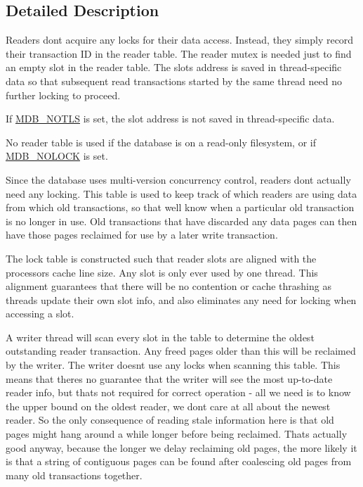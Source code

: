 \subsection{Detailed Description}
Readers don\textquotesingle{}t acquire any locks for their data access. Instead, they simply record their transaction ID in the reader table. The reader mutex is needed just to find an empty slot in the reader table. The slot\textquotesingle{}s address is saved in thread-\/specific data so that subsequent read transactions started by the same thread need no further locking to proceed.

If \mbox{\hyperlink{group__mdb__env_ga5dca84a576d14b4bfe2deddc2dc622d3}{M\+D\+B\+\_\+\+N\+O\+T\+LS}} is set, the slot address is not saved in thread-\/specific data.

No reader table is used if the database is on a read-\/only filesystem, or if \mbox{\hyperlink{group__mdb__env_ga9b0450b1a87cb9f22e033550e49e5037}{M\+D\+B\+\_\+\+N\+O\+L\+O\+CK}} is set.

Since the database uses multi-\/version concurrency control, readers don\textquotesingle{}t actually need any locking. This table is used to keep track of which readers are using data from which old transactions, so that we\textquotesingle{}ll know when a particular old transaction is no longer in use. Old transactions that have discarded any data pages can then have those pages reclaimed for use by a later write transaction.

The lock table is constructed such that reader slots are aligned with the processor\textquotesingle{}s cache line size. Any slot is only ever used by one thread. This alignment guarantees that there will be no contention or cache thrashing as threads update their own slot info, and also eliminates any need for locking when accessing a slot.

A writer thread will scan every slot in the table to determine the oldest outstanding reader transaction. Any freed pages older than this will be reclaimed by the writer. The writer doesn\textquotesingle{}t use any locks when scanning this table. This means that there\textquotesingle{}s no guarantee that the writer will see the most up-\/to-\/date reader info, but that\textquotesingle{}s not required for correct operation -\/ all we need is to know the upper bound on the oldest reader, we don\textquotesingle{}t care at all about the newest reader. So the only consequence of reading stale information here is that old pages might hang around a while longer before being reclaimed. That\textquotesingle{}s actually good anyway, because the longer we delay reclaiming old pages, the more likely it is that a string of contiguous pages can be found after coalescing old pages from many old transactions together. 


